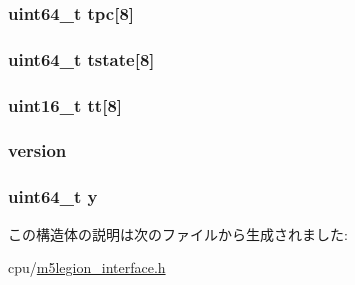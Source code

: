 \label{structSharedData_adcd7c004dfc3925d9ac7b8cd3043f563}
\hypertarget{structSharedData_a13203690bfb57af632ec75e59873dc70}{
\subsubsection[{tpc}]{\setlength{\rightskip}{0pt plus 5cm}uint64\_\-t {\bf tpc}\mbox{[}8\mbox{]}}}
\label{structSharedData_a13203690bfb57af632ec75e59873dc70}
\hypertarget{structSharedData_a6b9f90839fbdd22ce4fc36cda8cedf4d}{
\subsubsection[{tstate}]{\setlength{\rightskip}{0pt plus 5cm}uint64\_\-t {\bf tstate}\mbox{[}8\mbox{]}}}
\label{structSharedData_a6b9f90839fbdd22ce4fc36cda8cedf4d}
\hypertarget{structSharedData_ace83e493af528c843d1890906edc5ff8}{
\subsubsection[{tt}]{\setlength{\rightskip}{0pt plus 5cm}uint16\_\-t {\bf tt}\mbox{[}8\mbox{]}}}
\label{structSharedData_ace83e493af528c843d1890906edc5ff8}
\hypertarget{structSharedData_acd99bb05ca015e7d74448acb1deba7ca}{
\subsubsection[{version}]{ {\bf version}}}
\label{structSharedData_acd99bb05ca015e7d74448acb1deba7ca}
\hypertarget{structSharedData_a747cdfc01f99475e65b002cf67c7f850}{
\subsubsection[{y}]{\setlength{\rightskip}{0pt plus 5cm}uint64\_\-t {\bf y}}}
\label{structSharedData_a747cdfc01f99475e65b002cf67c7f850}


この構造体の説明は次のファイルから生成されました:\begin{DoxyCompactItemize}
\item 
cpu/\hyperlink{m5legion__interface_8h}{m5legion\_\-interface.h}\end{DoxyCompactItemize}
